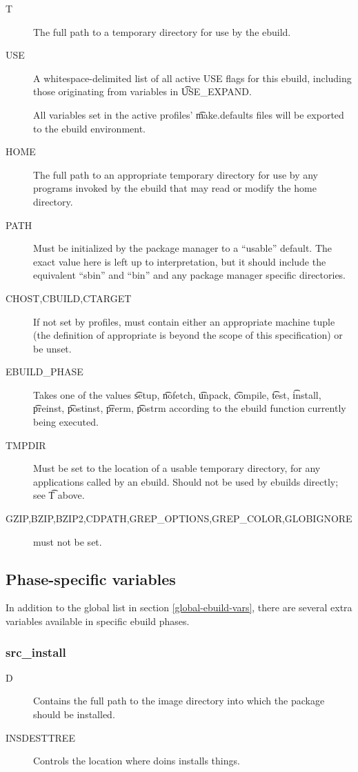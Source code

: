 \begin{description}
\item[T] The full path to a temporary directory for use by the ebuild.
\item[USE] A whitespace-delimited list of all active USE flags for this ebuild, including those
    originating from variables in \t{USE\_EXPAND}.
\item[] All variables set in the active profiles' \t{make.defaults} files will be exported to the
    ebuild environment.
\item[HOME] The full path to an appropriate temporary directory for use by any programs invoked by
    the ebuild that may read or modify the home directory.
\item[PATH] Must be initialized by the package manager to a ``usable'' default.  The exact value here
    is left up to interpretation, but it should include the equivalent ``sbin'' and ``bin'' and any
    package manager specific directories.
\item[CHOST,CBUILD,CTARGET] If not set by profiles, must contain either an appropriate
    machine tuple (the definition of appropriate is beyond the scope of this specification) or
    be unset.
\item[EBUILD\_PHASE] Takes one of the values \t{setup}, \t{nofetch}, \t{unpack}, \t{compile},
    \t{test}, \t{install}, \t{preinst}, \t{postinst}, \t{prerm}, \t{postrm} according to the ebuild
    function currently being executed.
\item[TMPDIR] Must be set to the location of a usable temporary directory, for any applications
    called by an ebuild. Should not be used by ebuilds directly; see \t{T} above.
\item[GZIP,BZIP,BZIP2,CDPATH,GREP\_OPTIONS,GREP\_COLOR,GLOBIGNORE] must not be set.
\end{description}


\subsection{Phase-specific variables}

In addition to the global list in section \ref{global-ebuild-vars}, there are several extra
variables available in specific ebuild phases.

\subsubsection{src\_install}
\begin{description}
\item[D] Contains the full path to the image directory into which the package should be installed.
\item[INSDESTTREE] Controls the location where doins installs things.
\end{description}

